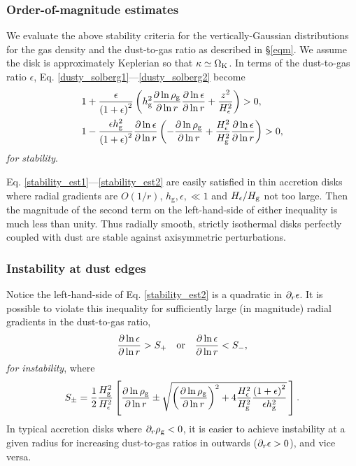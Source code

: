
\subsubsection{Order-of-magnitude estimates} 
We evaluate the above stability criteria for the vertically-Gaussian
distributions for the gas density and the dust-to-gas ratio as 
described in \S\ref{eqm}. 
We assume the disk is approximately Keplerian so that
$\kappa\simeq\Omega_{\rm K}$. In terms of the dust-to-gas
ratio $\epsilon$, Eq. \ref{dusty_solberg1}---\ref{dusty_solberg2}
become   
\begin{align}
  &1 + \frac{\epsilon}{\left(1+
    \epsilon\right)^2}\left(h_\mathrm{g}^2\frac{\partial\ln{\rho_\mathrm{g}}}{\partial\ln{r}}
  \frac{\partial\ln{\epsilon}}{\partial\ln{r}} + 
  \frac{z^2}{H_\epsilon^2}\right)>0 \label{stability_est1},   \\ 
&1 - \frac{\epsilon
  h_\mathrm{g}^2}{\left(1+\epsilon\right)^2}
  \frac{\partial\ln{\epsilon}}{\partial\ln{r}}\left(-\frac{\partial\ln{\rho_\mathrm{g}}}{\partial\ln{r}}+\frac{H_\epsilon^2}{H_\mathrm{g}^2}\frac{\partial\ln{\epsilon}}{\partial\ln{r}}\right)
  > 0 \label{stability_est2},
\end{align}
\emph{for stability}. 

Eq. \ref{stability_est1}---\ref{stability_est2} are easily satisfied
in thin accretion disks where radial gradients are $O(1/r)$, 
$h_\mathrm{g},\epsilon,\ll 1$ and $H_\epsilon/H_\mathrm{g}$ not too
large.  
Then the
magnitude of the second term on the left-hand-side  of either
inequality is much less than unity. Thus radially smooth, strictly
isothermal disks perfectly coupled with dust are stable against
axisymmetric perturbations.  


\subsubsection{Instability at dust edges}
Notice the left-hand-side of Eq. \ref{stability_est2} is a quadratic in
$\partial_r\epsilon$. It is possible to
violate this inequality for sufficiently large (in magnitude) radial
gradients  in the dust-to-gas ratio, 
\begin{align}
  \frac{\partial\ln{\epsilon}}{\partial\ln{r}} > S_+ \quad \mathrm{or} \quad 
  \frac{\partial\ln{\epsilon}}{\partial\ln{r}} < S_-,
\end{align}
\emph{for instability}, where
\begin{align}\label{spm}
S_\pm = \frac{1}{2}\frac{H_\mathrm{g}^2}{H_\epsilon^2} 
  \left[
  \frac{\partial\ln{\rho_\mathrm{g}}}{\partial\ln{r}} \pm 
  \sqrt{
  \left(\frac{\partial\ln{\rho_\mathrm{g}}}{\partial\ln{r}}\right)^2 + 
  4 \frac{H_\epsilon^2}{H_\mathrm{g}^2}
  \frac{\left(1+\epsilon\right)^2}{\epsilon h_\mathrm{g}^2}
  }
  \,\right]. 
\end{align} 
In typical accretion disks where $\partial_r\rho_\mathrm{g}<0$, it is easier to
achieve instability at a given radius for increasing dust-to-gas
ratios in outwards ($\partial_r\epsilon > 0$), and vice versa.  

